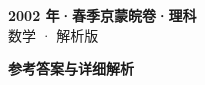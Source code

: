 \documentclass[zihao=-4, a4paper]{ctexart}
\begin{document}
\begin{center}
  {\Large\bfseries 2002 年·春季京蒙皖卷·理科}\\[4pt]
  {\large 数学 · 解析版}
\end{center}
\medskip
{}

\clearpage
{}
\begin{center}{\Large\bfseries 参考答案与详细解析}\end{center}
\medskip

\end{document}
